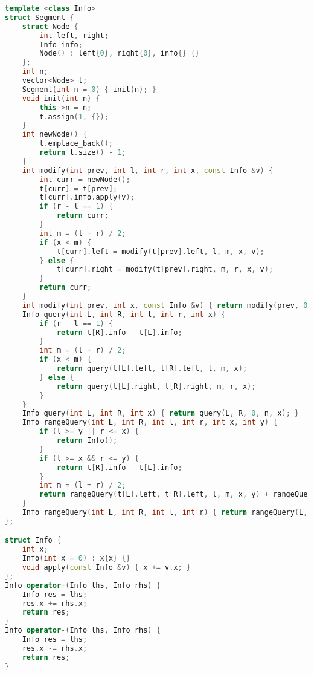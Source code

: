 \begin{lstlisting}[language=C++]
template <class Info>
struct Segment {
    struct Node {
        int left, right;
        Info info;
        Node() : left{0}, right{0}, info{} {}
    };
    int n;
    vector<Node> t;
    Segment(int n = 0) { init(n); }
    void init(int n) {
        this->n = n;
        t.assign(1, {});
    }
    int newNode() {
        t.emplace_back();
        return t.size() - 1;
    }
    int modify(int prev, int l, int r, int x, const Info &v) {
        int curr = newNode();
        t[curr] = t[prev];
        t[curr].info.apply(v);
        if (r - l == 1) {
            return curr;
        }
        int m = (l + r) / 2;
        if (x < m) {
            t[curr].left = modify(t[prev].left, l, m, x, v);
        } else {
            t[curr].right = modify(t[prev].right, m, r, x, v);
        }
        return curr;
    }
    int modify(int prev, int x, const Info &v) { return modify(prev, 0, n, x, v); }
    Info query(int L, int R, int l, int r, int x) {
        if (r - l == 1) {
            return t[R].info - t[L].info;
        }
        int m = (l + r) / 2;
        if (x < m) {
            return query(t[L].left, t[R].left, l, m, x);
        } else {
            return query(t[L].right, t[R].right, m, r, x);
        }
    }
    Info query(int L, int R, int x) { return query(L, R, 0, n, x); }
    Info rangeQuery(int L, int R, int l, int r, int x, int y) {
        if (l >= y || r <= x) {
            return Info();
        }
        if (l >= x && r <= y) {
            return t[R].info - t[L].info;
        }
        int m = (l + r) / 2;
        return rangeQuery(t[L].left, t[R].left, l, m, x, y) + rangeQuery(t[L].right, t[R].right, m, r, x, y);
    }
    Info rangeQuery(int L, int R, int l, int r) { return rangeQuery(L, R, 0, n, l, r); }
};

struct Info {
    int x;
    Info(int x = 0) : x{x} {}
    void apply(const Info &v) { x += v.x; }
};
Info operator+(Info lhs, Info rhs) {
    Info res = lhs;
    res.x += rhs.x;
    return res;
}
Info operator-(Info lhs, Info rhs) {
    Info res = lhs;
    res.x -= rhs.x;
    return res;
}
\end{lstlisting}
